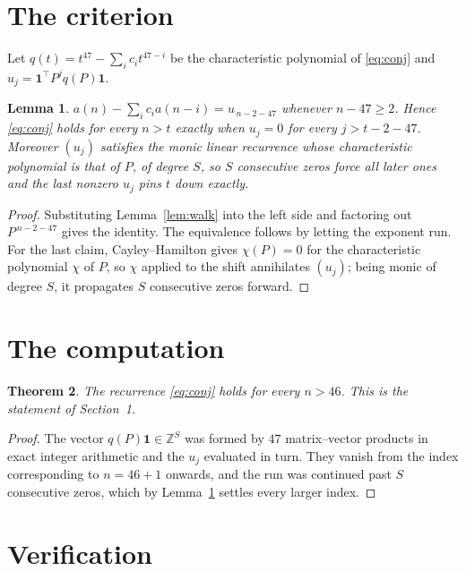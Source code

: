 \documentclass[11pt,a4paper]{article}
\theoremstyle{plain}
\newtheorem{theorem}{Theorem}
\newtheorem{lemma}[theorem]{Lemma}
\theoremstyle{definition}
\begin{document}
\section{The criterion}

Let $q(t)=t^{47}-\sum_i c_i t^{47-i}$ be the characteristic polynomial of
\eqref{eq:conj} and $u_j=\mathbf{1}^{\!\top}P^{j}q(P)\mathbf{1}$.

\begin{lemma}\label{lem:crit}
$a(n)-\sum_i c_i a(n-i)=u_{\,n-2-47}$ whenever $n-47\ge2$. Hence
\eqref{eq:conj} holds for every $n>t$ exactly when $u_j=0$ for every
$j>t-2-47$. Moreover $(u_j)$ satisfies the monic linear recurrence whose
characteristic polynomial is that of $P$, of degree $S$, so $S$ consecutive zeros force all
later ones and the last nonzero $u_j$ pins $t$ down exactly.
\end{lemma}

\begin{proof}
Substituting Lemma~\ref{lem:walk} into the left side and factoring out
$P^{\,n-2-47}$ gives the identity. The equivalence follows by letting the exponent
run. For the last claim, Cayley--Hamilton gives $\chi(P)=0$ for the characteristic
polynomial $\chi$ of $P$, so $\chi$ applied to the shift annihilates $(u_j)$; being monic of
degree $S$, it propagates $S$ consecutive zeros forward.
\end{proof}

\section{The computation}

\begin{theorem}
The recurrence \eqref{eq:conj} holds for every $n>46$. This is the statement of
Section~1.
\end{theorem}

\begin{proof}
The vector $q(P)\mathbf{1}\in\mathbb{Z}^{S}$ was formed by $47$ matrix--vector
products in exact integer arithmetic and the $u_j$ evaluated in turn. They vanish from the
index corresponding to $n=46+1$ onwards, and the run was continued past $S$ consecutive
zeros, which by Lemma~\ref{lem:crit} settles every larger index.
\end{proof}

\section{Verification}
\end{document}
